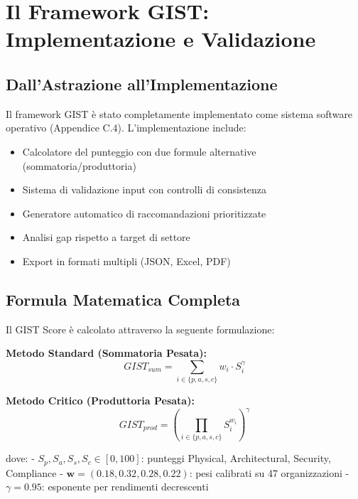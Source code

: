 \section{\texorpdfstring{Il Framework GIST: Implementazione e Validazione}{5.3 - Il Framework GIST: Implementazione e Validazione}}
\label{sec:5.3}

\subsection{\texorpdfstring{Dall'Astrazione all'Implementazione}{5.3.1 - Dall'Astrazione all'Implementazione}}

Il framework GIST è stato completamente implementato come sistema software operativo (Appendice C.4). L'implementazione include:

\begin{itemize}
\item Calcolatore del punteggio con due formule alternative (sommatoria/produttoria)
\item Sistema di validazione input con controlli di consistenza
\item Generatore automatico di raccomandazioni prioritizzate
\item Analisi gap rispetto a target di settore
\item Export in formati multipli (JSON, Excel, PDF)
\end{itemize}

\subsection{\texorpdfstring{Formula Matematica Completa}{5.3.2 - Formula Matematica Completa}}

Il GIST Score è calcolato attraverso la seguente formulazione:

\textbf{Metodo Standard (Sommatoria Pesata):}
\begin{equation}
GIST_{sum} = \sum_{i \in \{p,a,s,c\}} w_i \cdot S_i^{\gamma}
\end{equation}

\textbf{Metodo Critico (Produttoria Pesata):}
\begin{equation}
GIST_{prod} = \left(\prod_{i \in \{p,a,s,c\}} S_i^{w_i}\right)^{\gamma}
\end{equation}

dove:
- $S_p, S_a, S_s, S_c \in [0,100]$: punteggi Physical, Architectural, Security, Compliance
- $\mathbf{w} = (0.18, 0.32, 0.28, 0.22)$: pesi calibrati su 47 organizzazioni
- $\gamma = 0.95$: esponente per rendimenti decrescenti

